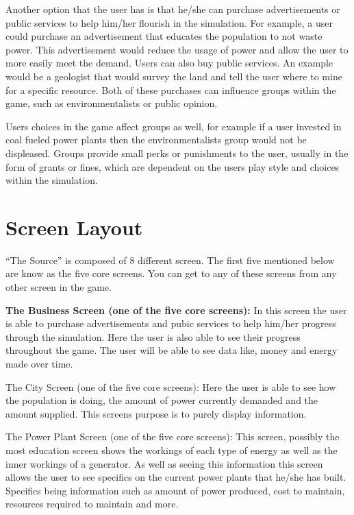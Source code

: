 \documentclass[msc,oneside]{ubcthesis}%
\begin{document}
Another option that the user has is that he/she can purchase advertisements or public services to help 
him/her flourish in the simulation. For example, a user could purchase an advertisement that educates the 
population to not waste power. This advertisement would reduce the usage of power and allow the user to 
more easily meet the demand. Users can also buy public services. An example would be a geologist that would 
survey the land and tell the user where to mine for a specific resource. Both of these purchases can 
influence groups within the game, such as environmentalists or public opinion. 
\bigskip


Users choices in the game affect groups as well, for example if a user invested in coal fueled power plants then the environmentalists group would not be displeased. Groups provide small perks or punishments to the user, usually in the form of grants or fines, which are dependent on the users play style and choices within the simulation. 


\section{Screen Layout}
“The Source” is composed of 8 different screen. The first five mentioned below are know as the five core screens. You can get to any of these screens from any other screen in the game. 
\bigskip

\noindent \large \textbf{ The Business Screen (one of the five core screens):} \newline
\indent In this screen the user is able to purchase advertisements and pubic services to help him/her 
progress through the simulation. Here the user is also able to see their progress throughout the game. The 
user will be able to see data like, money and energy made over time.  
\bigskip

\noindent The City Screen (one of the five core screens): \newline
\indent Here the user is able to see how the population is doing, the amount of power currently demanded and the amount supplied. This screens purpose is to purely display information.
\bigskip

\noindent The Power Plant Screen (one of the five core screens): \newline
\indent This screen, possibly the most education screen shows the workings of each type of energy as well as the inner workings of a generator. As well as seeing this information this screen allows the user to 
see specifics on the current power plants that he/she has built. Specifics being information such as 
amount of power produced, cost to maintain, resources required to maintain and more. 
\bigskip
\end{document}
